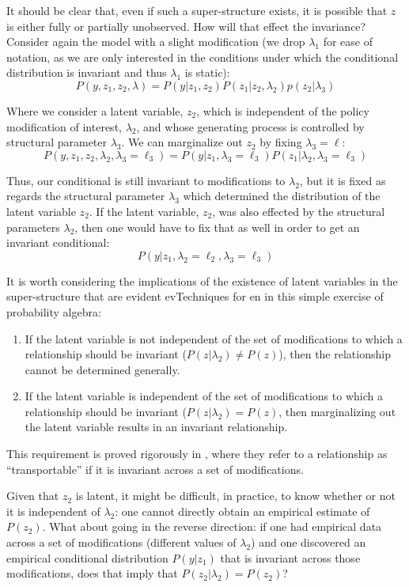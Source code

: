 \documentclass[a4paper,12pt]{article}
\begin{document}
It should be clear that, even if such a super-structure exists, it is possible that $z$ is either fully or partially unobserved. How will that effect the invariance? Consider again the model with a slight modification (we drop $\lambda_1$ for ease of notation, as we are only interested in the conditions under which the conditional distribution is invariant and thus $\lambda_1$ is static):
%
$$
P(y, z_1, z_2, \lambda) = P(y | z_1, z_2)P(z_1 | z_2, \lambda_2)p(z_2 | \lambda_3)
$$

Where we consider a latent variable, $z_2$, which is independent of the policy modification of interest, $\lambda_2$, and whose generating process is controlled by structural parameter $\lambda_3$. We can marginalize out $z_2$ by fixing $\lambda_3 = \ell$: 
%
$$
P(y, z_1, z_2, \lambda_2, \lambda_3 = \ell_3) = P(y | z_1, \lambda_3 = \ell_3)P(z_1 | \lambda_2, \lambda_3 = \ell_3)
$$

Thus, our conditional is still invariant to modifications to $\lambda_2$, but it is fixed as regards the structural parameter $\lambda_3$ which determined the distribution of the latent variable $z_2$. If the latent variable, $z_2$, was also effected by the structural parameters $\lambda_2$, then one would have to fix that as well in order to get an invariant conditional: 
%
$$
P(y | z_1, \lambda_2 = \ell_2, \lambda_3 = \ell_3)
$$

It is worth considering the implications of the existence of latent variables in the super-structure that are evident evTechniques for en in this simple exercise of probability algebra: 

\begin{enumerate}
\item If the latent variable is not independent of the set of modifications to which a relationship should be invariant ($P(z | \lambda_2) \neq P(z)$), then the relationship cannot be determined generally.
\item If the latent variable is independent of the set of modifications to which a relationship should be invariant ($P(z | \lambda_2) = P(z)$, then marginalizing out the latent variable results in an invariant relationship. 
\end{enumerate}

This requirement is proved rigorously in \cite{Pearl2014}, where they refer to a relationship as ``transportable'' if it is invariant across a set of modifications. 

Given that $z_2$ is latent, it might be difficult, in practice, to know whether or not it is independent of $\lambda_2$: one cannot directly obtain an empirical estimate of $P(z_2)$. What about going in the reverse direction: if one had empirical data across a set of modifications (different values of $\lambda_2$) and one discovered an empirical conditional distribution $P(y | z_1)$ that is invariant across those modifications, does that imply that $P(z_2 | \lambda_2) = P(z_2)$?
\end{document}
